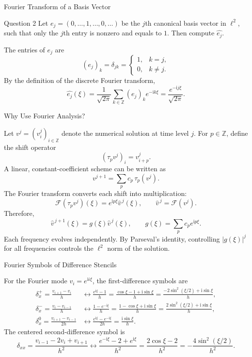 \documentclass{beamer}
\newcommand{\ii}{\mathrm{i}}
\begin{document}
\begin{frame}{Fourier Transform of a Basis Vector}

\begin{block}{Question 2}
Let $e_j=(0,\ldots,1,\ldots,0,\ldots)$ be the $j$th canonical basis
vector in $\ell^2$, such that only the $j$th entry is nonzero and equals
to $1$. Then compute $\widehat{e_j}$.
\end{block}

The entries of $e_j$ are
\[
(e_j)_k=\delta_{jk}
=
\begin{cases}
1, & k=j,\\
0, & k\ne j.
\end{cases}
\]
By the definition of the discrete Fourier transform,
\[
\widehat{e_j}(\xi)
=
\frac{1}{\sqrt{2\pi}}
\sum_{k\in\mathbb{Z}}(e_j)_k e^{-\ii k\xi}
=
\frac{e^{-\ii j\xi}}{\sqrt{2\pi}}.
\]

\end{frame}



\begin{frame}{Why Use Fourier Analysis?}

Let $v^j=(v_i^j)_{i\in\mathbb{Z}}$ denote the numerical solution at time
level $j$. For $p\in\mathbb{Z}$, define the shift operator
\[
(\tau_p v^j)_i=v_{i+p}^j.
\]
A linear, constant-coefficient scheme can be written as
\[
v^{j+1}=\sum_p c_p\,\tau_p(v^j).
\]
The Fourier transform converts each shift into multiplication:
\[
\mathcal{F}(\tau_p v^j)(\xi)
=e^{\ii p\xi}\widehat v^{\,j}(\xi),
\qquad
\widehat v^{\,j}=\mathcal{F}(v^j).
\]
Therefore,
\[
\widehat v^{\,j+1}(\xi)
=g(\xi)\widehat v^{\,j}(\xi),
\qquad
g(\xi)=\sum_p c_p e^{\ii p\xi}.
\]
Each frequency evolves independently. By Parseval's identity, controlling $|g(\xi)|^j$ for all frequencies
controls the $\ell^2$ norm of the solution.

\end{frame}

\begin{frame}{Fourier Symbols of Difference Stencils}

For the Fourier mode $v_i=e^{\ii i\xi}$, the first-difference symbols are
\[
\begin{aligned}
\delta_x^+ = \frac{v_{i+1}-v_i}{h}
&\longleftrightarrow
\frac{e^{\ii\xi}-1}{h}
=\frac{\cos\xi-1+\ii\sin\xi}{h}
=\frac{-2\sin^2(\xi/2)+\ii\sin\xi}{h},\\[2pt]
\delta_x^- = \frac{v_{i}-v_{i-1}}{h}
&\longleftrightarrow
\frac{1-e^{-\ii\xi}}{h}
=\frac{1-\cos\xi+\ii\sin\xi}{h}
=\frac{2\sin^2(\xi/2)+\ii\sin\xi}{h},\\[2pt]
\delta_x^0 = \frac{v_{i+1}-v_{i-1}}{2h}
&\longleftrightarrow
\frac{e^{\ii\xi}-e^{-\ii\xi}}{2h}
=\frac{\ii\sin\xi}{h}.
\end{aligned}
\]
The centered second-difference symbol is
\[
\delta_{xx}=\frac{v_{i-1}-2v_i+v_{i+1}}{h^2}
\longleftrightarrow
\frac{e^{-\ii\xi}-2+e^{\ii\xi}}{h^2}
=
\frac{2\cos\xi-2}{h^2}
=
-\frac{4\sin^2(\xi/2)}{h^2}.
\]

\end{frame}
\end{document}
